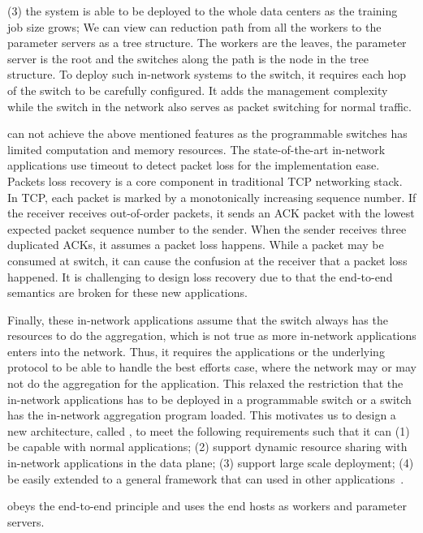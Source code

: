 (3) the system is able to be deployed to the whole data centers as
the training job size grows;
We can view can reduction path from all the workers to the parameter servers as a tree structure.
The workers are the leaves, the parameter server is the root and the switches along the path 
is the node in the tree structure.
To deploy such in-network systems to the switch, it requires each hop of the switch 
to be carefully configured.
It adds the management complexity while the switch 
in the network also serves as packet switching for normal traffic.


\switchml can not achieve the above mentioned features as the programmable
switches has limited computation and memory resources.
The state-of-the-art in-network applications use timeout to detect packet loss for the implementation ease. Packets loss recovery is a core component in
traditional TCP networking stack.
In TCP, each packet is marked by a monotonically increasing sequence number. 
If the receiver receives out-of-order packets, it sends an ACK packet with the lowest 
expected packet sequence number to the sender. 
When the sender receives three duplicated ACKs, it assumes a packet loss happens.
While a packet may be consumed at switch, it can cause the confusion at the receiver
that a packet loss happened. It is challenging to design loss recovery due to that the end-to-end semantics are broken 
for these new applications.
 
Finally, these in-network applications assume that the switch always has the resources to do the aggregation,
which is not true as more in-network applications enters into the network. Thus, it requires the applications or
the underlying protocol to be able to handle the best efforts case, where the network may or may not do the 
aggregation for the application. This relaxed the restriction that the in-network applications has to be deployed 
in a programmable switch or a switch has the in-network aggregation program loaded.   
\fi 
This motivates us to design a new architecture, called \system, to meet the following requirements such that it can (1) be capable with normal applications; (2) support dynamic resource sharing with in-network applications in the data plane;
(3) support large scale deployment; (4) be easily extended to a general framework that can used in other applications~. 

\system obeys the end-to-end principle and uses the end hosts as workers and parameter servers. 
